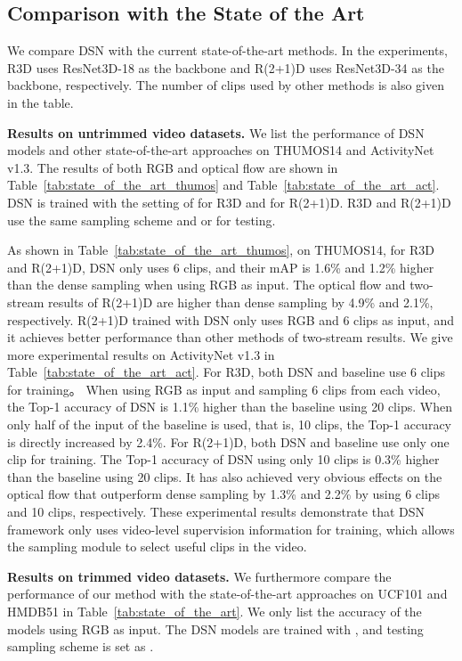 \documentclass[journal]{IEEEtran}
\begin{document}
\subsection{Comparison with the State of the Art}
We compare DSN with the current state-of-the-art methods.
In the experiments, R3D uses ResNet3D-18 as the backbone and R(2+1)D uses ResNet3D-34 as the backbone, respectively.
The number of clips used by other methods is also given in the table.

\textbf{Results on untrimmed video datasets.}
We list the performance of DSN models and other state-of-the-art approaches on THUMOS14 and ActivityNet v1.3.
The results of both RGB and optical flow are shown in Table~\ref{tab:state_of_the_art_thumos} and Table~\ref{tab:state_of_the_art_act}.
DSN is trained with the setting of  for R3D and  for R(2+1)D.
R3D and R(2+1)D use the same sampling scheme  and  or  for testing.

As shown in Table~\ref{tab:state_of_the_art_thumos}, on THUMOS14, for R3D and R(2+1)D, DSN only uses 6 clips, and their mAP is 1.6\% and 1.2\% higher than the dense sampling when using RGB as input.
The optical flow and two-stream results of R(2+1)D are higher than dense sampling by 4.9\% and 2.1\%, respectively.
R(2+1)D trained with DSN only uses RGB and 6 clips as input, and it achieves better performance than other methods of two-stream results.
We give more experimental results on ActivityNet v1.3 in Table~\ref{tab:state_of_the_art_act}.
For R3D, both DSN and baseline use 6 clips for training。
When using RGB as input and sampling 6 clips from each video, the Top-1 accuracy of DSN is 1.1\% higher than the baseline using 20 clips.
When only half of the input of the baseline is used, that is, 10 clips, the Top-1 accuracy is directly increased by 2.4\%.
For R(2+1)D, both DSN and baseline use only one clip for training.
The Top-1 accuracy of DSN using only 10 clips is 0.3\% higher than the baseline using 20 clips.
It has also achieved very obvious effects on the optical flow that outperform dense sampling by 1.3\% and 2.2\% by using 6 clips and 10 clips, respectively. These experimental results demonstrate that DSN framework only uses video-level supervision information for training, which allows the sampling module to select useful clips in the video.

\textbf{Results on trimmed video datasets.}
We furthermore compare the performance of our method with the state-of-the-art approaches on UCF101 and HMDB51 in Table~\ref{tab:state_of_the_art}.
We only list the accuracy of the models using RGB as input.
The DSN models are trained with , and testing sampling scheme is set as .
\end{document}
